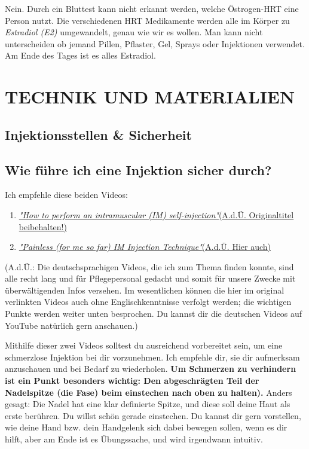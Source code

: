 \documentclass{article}
\begin{document}
Nein. Durch ein Bluttest kann nicht erkannt werden, welche Östrogen-HRT eine Person nutzt. Die verschiedenen HRT Medikamente werden alle im Körper zu \textit{Estradiol (E2)} umgewandelt, genau wie wir es wollen. Man kann nicht unterscheiden ob jemand Pillen, Pflaster, Gel, Sprays oder Injektionen verwendet. Am Ende des Tages ist es alles Estradiol.



\section{TECHNIK UND MATERIALIEN} \label{ts}

\subsection*{Injektionsstellen \& Sicherheit}

\subsection{Wie führe ich eine Injektion sicher durch?}

Ich empfehle diese beiden Videos:

\begin{enumerate}
  \item \href{https://www.youtube.com/watch?v=cBabaGC2Dok}{\textit{"How to perform an intramuscular (IM) self-injection"}(A.d.Ü. Originaltitel beibehalten!)}
  \item \href{https://www.youtube.com/watch?v=YfNlAZLxLyw}{\textit{"Painless (for me so far) IM Injection Technique"}(A.d.Ü. Hier auch)}
\end{enumerate}

(A.d.Ü.: Die deutschsprachigen Videos, die ich zum Thema finden konnte, sind alle recht lang und für Pflegepersonal gedacht und somit für unsere Zwecke mit überwältigenden Infos versehen. Im wesentlichen können die hier im original verlinkten Videos auch ohne Englischkenntnisse verfolgt werden; die wichtigen Punkte werden weiter unten besprochen. Du kannst dir die deutschen Videos auf YouTube natürlich gern anschauen.)

Mithilfe dieser zwei Videos solltest du ausreichend vorbereitet sein, um eine schmerzlose Injektion bei dir vorzunehmen. Ich empfehle dir, sie dir aufmerksam anzuschauen und bei Bedarf zu wiederholen. \textbf{Um Schmerzen zu verhindern ist ein Punkt besonders wichtig: Den abgeschrägten Teil der Nadelspitze (die Fase) beim einstechen nach oben zu halten).} Anders gesagt: Die Nadel hat eine klar definierte Spitze, und diese soll deine Haut als erste berühren. Du willst schön gerade einstechen. Du kannst dir gern vorstellen, wie deine Hand bzw. dein Handgelenk sich dabei bewegen sollen, wenn es dir hilft, aber am Ende ist es Übungssache, und wird irgendwann intuitiv.
\end{document}
